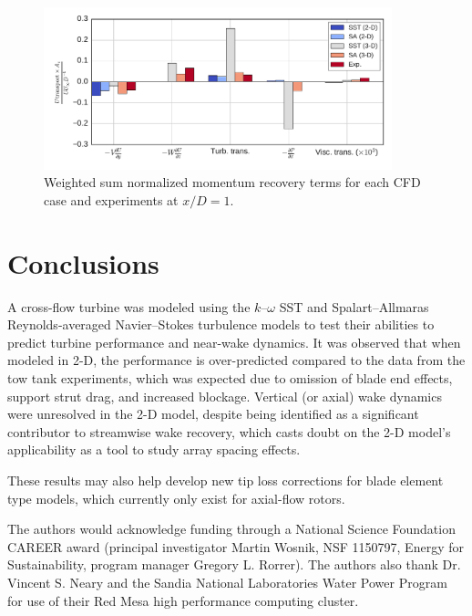 \documentclass[aip,graphicx]{revtex4-1}
\begin{document}
\begin{figure}[ht]
    \centering

    \includegraphics[width=0.9\textwidth]{figures/mom_bar_graph}

    \caption{Weighted sum normalized momentum recovery terms for each CFD case
        and experiments\cite{Bachant2015-RVAT-Re-dep-data} at $x/D=1$.}

    \label{fig:recovery}
\end{figure}


\section{Conclusions}

A cross-flow turbine was modeled using the $k$--$\omega$ SST and
Spalart--Allmaras Reynolds-averaged Navier--Stokes turbulence models to test
their abilities to predict turbine performance and near-wake dynamics. It was
observed that when modeled in 2-D, the performance is over-predicted compared to
the data from the tow tank experiments, which was expected due to omission of
blade end effects, support strut drag, and increased blockage. Vertical (or
axial) wake dynamics were unresolved in the 2-D model, despite being identified
as a significant contributor to streamwise wake recovery, which casts doubt on
the 2-D model's applicability as a tool to study array spacing effects.

These results may also help develop new tip loss corrections for blade element
type models, which currently only exist for axial-flow rotors.


\begin{acknowledgments}
    The authors would acknowledge funding through a National Science Foundation
    CAREER award (principal investigator Martin Wosnik, NSF 1150797, Energy for
    Sustainability, program manager Gregory L. Rorrer). The authors also thank
    Dr. Vincent S. Neary and the Sandia National Laboratories Water Power
    Program for use of their Red Mesa high performance computing cluster.
\end{acknowledgments}


\end{document}
